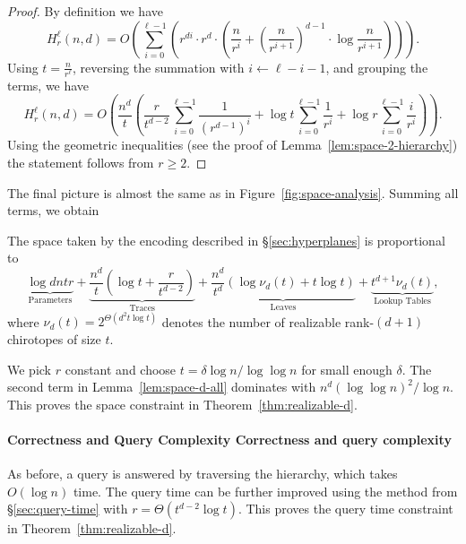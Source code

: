 \begin{proof}
By definition we have
\begin{displaymath}
H_r^\ell(n,d)
= O \left(
  \sum_{i=0}^{\ell-1} \left(
	r^{di} \cdot r^d \cdot \left(
	  \frac{n}{r^i} + {\left(\frac{n}{r^{i+1}}\right)}^{d-1} \cdot \log \frac{n}{r^{i+1}}
    \right)
  \right)
\right).
\end{displaymath}
%
Using \(t = \frac{n}{r^{\ell}}\), reversing the summation with
\(i \leftarrow \ell - i - 1\), and grouping the terms, we have
\begin{displaymath}
H_r^\ell(n,d)
=
O \left(
\frac{n^d}{t} \left(
	\frac{r}{t^{d-2}}
	\sum_{i=0}^{\ell-1} \frac{1}{{(r^{d-1})}^i}
	+
	\log t
	\sum_{i=0}^{\ell-1} \frac{1}{r^i}
	+
	\log r
	\sum_{i=0}^{\ell-1} \frac{i}{r^i}
\right)
\right).
\end{displaymath}
%
Using the geometric inequalities
(see the proof of Lemma~\ref{lem:space-2-hierarchy})
the statement follows from \(r \geq 2\).
%
\end{proof}


The final picture is almost the same as in Figure~\ref{fig:space-analysis}.
%
Summing all terms, we obtain
%
\begin{lemma}\label{lem:space-d-all}
    The space taken by the encoding described in \S\ref{sec:hyperplanes}
    is proportional to
    \begin{displaymath}
      \underbrace{\log dntr}_{\text{Parameters}}
      +
      \underbrace{\frac{n^d}{t} \left( \log t + \frac{r}{t^{d-2}} \right)}_{\text{Traces}}
      +
      \underbrace{\frac{n^d}{t^d} ( \log \nu_d(t) + t \log t )}_{\text{Leaves}}
      +
      \underbrace{t^{d+1}\nu_d(t)}_{\text{Lookup Tables}},
    \end{displaymath}
    where \(\nu_d(t) = 2^{\Theta(d^2 t \log t)}\) denotes the number of
    realizable rank-\((d+1)\) chirotopes of size \(t\).
\end{lemma}

We pick \(r\) constant and choose \(t = \delta \log n / \log \log n\) for small
enough \(\delta\). The second term in Lemma~\ref{lem:space-d-all} dominates
with \(n^d {(\log \log n)}^2 / \log n\). This proves the space constraint in
Theorem~\ref{thm:realizable-d}.

\paragraph*{\iftitlecase%
Correctness and Query Complexity\else%
Correctness and query complexity\fi}
As before, a query is answered by traversing the hierarchy, which takes
\(O(\log n)\) time. The query time can be further improved using the method from
\S\ref{sec:query-time} with \(r = \Theta(t^{d-2} \log t)\). This proves the
query time constraint in Theorem~\ref{thm:realizable-d}.

